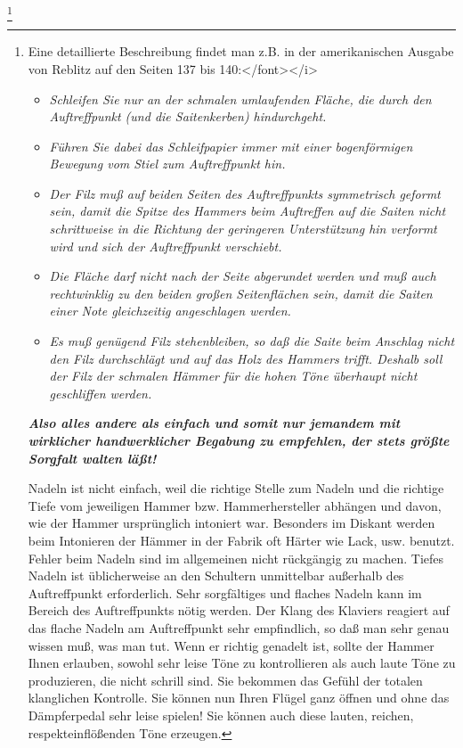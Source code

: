 \footnote{Eine detaillierte Beschreibung findet man z.B. in der amerikanischen Ausgabe von Reblitz auf den Seiten 137 bis 140:</font></i>

\begin{itemize} 
\item \textit{Schleifen Sie nur an der schmalen umlaufenden Fläche, die durch den Auftreffpunkt (und die Saitenkerben) hindurchgeht.}
\item \textit{Führen Sie dabei das Schleifpapier immer mit einer bogenförmigen Bewegung vom Stiel zum Auftreffpunkt hin.}
\item \textit{Der Filz muß auf beiden Seiten des Auftreffpunkts symmetrisch geformt sein, damit die Spitze des Hammers beim Auftreffen auf die Saiten nicht schrittweise in die Richtung der geringeren Unterstützung hin verformt wird und sich der Auftreffpunkt verschiebt.}
\item \textit{Die Fläche darf nicht nach der Seite abgerundet werden und muß auch rechtwinklig zu den beiden großen Seitenflächen sein, damit die Saiten einer Note gleichzeitig angeschlagen werden.}
\item \textit{Es muß genügend Filz stehenbleiben, so daß die Saite beim Anschlag nicht den Filz durchschlägt und auf das Holz des Hammers trifft.
Deshalb soll der Filz der schmalen Hämmer für die hohen Töne überhaupt nicht geschliffen werden.}
\end{itemize}

\textit{\textbf{Also alles andere als einfach und somit nur jemandem mit wirklicher handwerklicher Begabung zu empfehlen, der stets größte Sorgfalt walten läßt!}}

Nadeln ist nicht einfach, weil die richtige Stelle zum Nadeln und die richtige Tiefe vom jeweiligen Hammer bzw. Hammerhersteller abhängen und davon, wie der Hammer ursprünglich intoniert war.
Besonders im Diskant werden beim Intonieren der Hämmer in der Fabrik oft Härter wie Lack, usw. benutzt.
Fehler beim Nadeln sind im allgemeinen nicht rückgängig zu machen.
Tiefes Nadeln ist üblicherweise an den Schultern unmittelbar außerhalb des Auftreffpunkt erforderlich.
Sehr sorgfältiges und flaches Nadeln kann im Bereich des Auftreffpunkts nötig werden.
Der Klang des Klaviers reagiert auf das flache Nadeln am Auftreffpunkt sehr empfindlich, so daß man sehr genau wissen muß, was man tut.
Wenn er richtig genadelt ist, sollte der Hammer Ihnen erlauben, sowohl sehr leise Töne zu kontrollieren als auch laute Töne zu produzieren, die nicht schrill sind.
Sie bekommen das Gefühl der totalen klanglichen Kontrolle.
Sie können nun Ihren Flügel ganz öffnen und ohne das Dämpferpedal sehr leise spielen!
Sie können auch diese lauten, reichen, respekteinflößenden Töne erzeugen.
 

}

